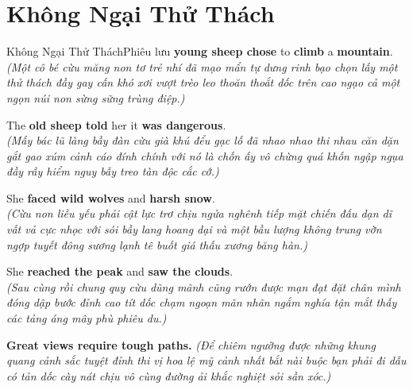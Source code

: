\section{Không Ngại Thử Thách}
\begin{truyen}{Không Ngại Thử Thách}{Phiêu lưu}
 \textbf{young sheep chose} to \textbf{climb} a \textbf{mountain}.\\
\textit{(Một cô bé cừu măng non tơ trẻ nhí đã mạo mẩn tự dưng rinh bạo chọn lấy một thử thách đầy gay cấn khó xơi vượt trèo leo thoăn thoắt dốc trên cao ngạo cả một ngọn núi non sừng sững trùng điệp.)}

The \textbf{old sheep told} her it \textbf{was dangerous}.\\
\textit{(Mấy bác lũ làng bầy đàn cừu già khú đểu gạc lố đã nhao nhao thi nhau căn dặn gắt gao xúm cảnh cáo đính chính với nó là chốn ấy vô chừng quá khốn ngập ngụa đầy rẫy hiểm nguy bẫy treo tàn độc cắc cớ.)}

She \textbf{faced wild wolves} and \textbf{harsh snow}.\\
\textit{(Cừu non liễu yếu phải cật lực trơ chịu ngửa nghênh tiếp mặt chiến đấu dạn dĩ vất vả cực nhọc với sói bầy lang hoang dại và một bầu lượng không trung vờn ngợp tuyết đông sương lạnh tê buốt giá thấu xương băng hàn.)}

She \textbf{reached the peak} and \textbf{saw the clouds}.\\
\textit{(Sau cùng rồi chung quy cừu dũng mãnh cũng rướn được mạn đạt đặt chân mình đóng dập bước đỉnh cao tít dốc chạm ngoạn mãn nhãn ngắm nghía tận mắt thấy các tảng áng mây phù phiêu du.)}
\end{truyen}

\begin{baihoc}
  \textbf{Great views require tough paths.} \textit{(Để chiêm ngưỡng được những khung quang cảnh sắc tuyệt đỉnh thi vị hoa lệ mỹ cảnh nhất bắt nài buộc bạn phải đi dẫu có tản dốc cày nát chịu vô cùng đường ải khắc nghiệt sỏi sần xóc.)}
\end{baihoc}

\vspace{0.8cm}

\ngayDay{}
